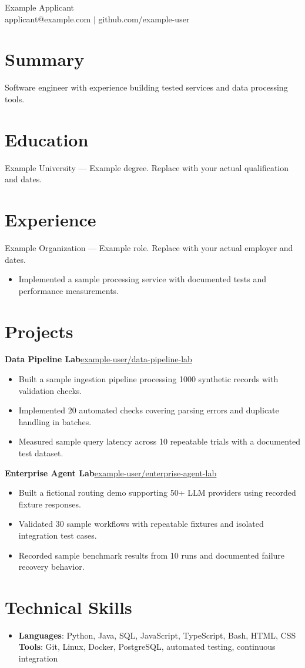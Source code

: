 \documentclass[10pt,letterpaper]{article}
\newcommand{\resumeProjectHeading}[2]{\textbf{#1}\hfill #2\par}
\newcommand{\resumeItem}[1]{\item #1}
\begin{document}
\begin{center}{\Large Example Applicant}\\
applicant@example.com $|$ github.com/example-user\end{center}
\section*{Summary}
Software engineer with experience building tested services and data processing tools.
\section{Education}
Example University --- Example degree. Replace with your actual qualification and dates.
\section{Experience}
Example Organization --- Example role. Replace with your actual employer and dates.
\begin{itemize}[nosep,leftmargin=*]
\resumeItem{Implemented a sample processing service with documented tests and performance measurements.}
\end{itemize}
\section{Projects}
\resumeProjectHeading{\textbf{Data Pipeline Lab}}{\href{https://github.com/example-user/data-pipeline-lab}{\underline{example-user/data-pipeline-lab}}}
\begin{itemize}[nosep,leftmargin=*]
\resumeItem{Built a sample ingestion pipeline processing 1000 synthetic records with validation checks.}
\resumeItem{Implemented 20 automated checks covering parsing errors and duplicate handling in batches.}
\resumeItem{Measured sample query latency across 10 repeatable trials with a documented test dataset.}
\end{itemize}
\resumeProjectHeading{\textbf{Enterprise Agent Lab}}{\href{https://github.com/example-user/enterprise-agent-lab}{\underline{example-user/enterprise-agent-lab}}}
\begin{itemize}[nosep,leftmargin=*]
\resumeItem{Built a fictional routing demo supporting 50+ LLM providers using recorded fixture responses.}
\resumeItem{Validated 30 sample workflows with repeatable fixtures and isolated integration test cases.}
\resumeItem{Recorded sample benchmark results from 10 runs and documented failure recovery behavior.}
\end{itemize}
\section{Technical Skills}
\begin{itemize}[nosep,leftmargin=*]
\item {\textbf{Languages}{: Python, Java, SQL, JavaScript, TypeScript, Bash, HTML, CSS}\\
\textbf{Tools}{: Git, Linux, Docker, PostgreSQL, automated testing, continuous integration}}
\end{itemize}
\end{document}
